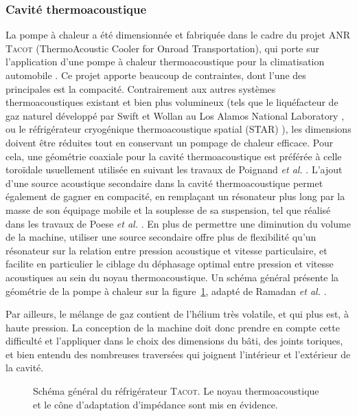 \subsubsection{Cavité thermoacoustique}
La pompe à chaleur a été dimensionnée et fabriquée dans le cadre du projet ANR \textsc{Tacot} (ThermoAcoustic Cooler for Onroad Transportation), qui porte sur l'application d'une pompe à chaleur thermoacoustique pour la climatisation automobile \cite{ANR_thermo-acoustic_2019}. Ce projet apporte beaucoup de contraintes, dont l'une des principales est la compacité. Contrairement aux autres systèmes thermoacoustiques existant et bien plus volumineux (tels que le liquéfacteur de gaz naturel développé par Swift et Wollan au Los Alamos National Laboratory \cite{swift_thermoacoustics_2002, wollan_development_2002}, ou le réfrigérateur cryogénique thermoacoustique spatial (STAR) \cite{adeff_measurement_1991, garrett_thermoacoustic_1993}), les dimensions doivent être réduites tout en conservant un pompage de chaleur efficace. Pour cela, une géométrie coaxiale pour la cavité thermoacoustique est préférée à celle toroïdale usuellement utilisée en suivant les travaux de Poignand \textit{et al.} \cite{poignand_thermoacoustic_2011, poignand_analysis_2013}. L'ajout d'une source acoustique secondaire dans la cavité thermoacoustique permet également de gagner en compacité, en remplaçant un résonateur plus long par la masse de son équipage mobile et la souplesse de sa suspension, tel que réalisé dans les travaux de Poese \textit{et al.} \cite{poese_thermoacoustic_2004}. En plus de permettre une diminution du volume de la machine, utiliser une source secondaire offre plus de flexibilité qu'un résonateur sur la relation entre pression acoustique et vitesse particulaire, et facilite en particulier le ciblage du déphasage optimal entre pression et vitesse acoustiques au sein du noyau thermoacoustique. Un schéma général présente la géométrie de la pompe à chaleur sur la figure~\ref{fig:SchemaGeneralTACOT}, adapté de Ramadan \textit{et al.} \cite{ramadan_design_2021}. \smallskip

Par ailleurs, le mélange de gaz contient de l'hélium très volatile, et qui plus est, à haute pression. La conception de la machine doit donc prendre en compte cette difficulté et l'appliquer dans le choix des dimensions du bâti, des joints toriques, et bien entendu des nombreuses traversées qui joignent l'intérieur et l'extérieur de la cavité. 

\begin{figure}[!ht]
    \centering
    
    \caption{Schéma général du réfrigérateur \textsc{Tacot}. Le noyau thermoacoustique et le cône d'adaptation d'impédance sont mis en évidence.}
    \label{fig:SchemaGeneralTACOT}
\end{figure}

